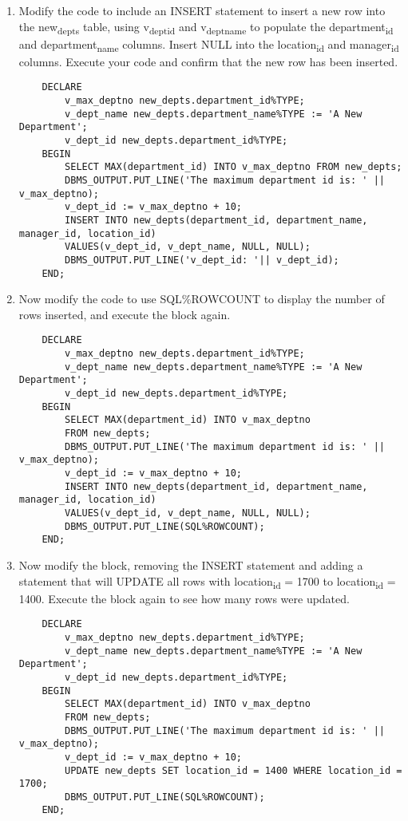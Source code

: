\documentclass[11pt]{article}
\begin{document}
\begin{enumerate}
\item Modify the code to include an INSERT statement to insert a new row into the new\textsubscript{depts} table, using v\textsubscript{dept}\textsubscript{id} and v\textsubscript{dept}\textsubscript{name} to populate the department\textsubscript{id} and department\textsubscript{name} columns. Insert NULL into the location\textsubscript{id} and manager\textsubscript{id} columns.  Execute your code and confirm that the new row has been inserted.

\begin{verbatim}
    DECLARE
        v_max_deptno new_depts.department_id%TYPE;
        v_dept_name new_depts.department_name%TYPE := 'A New Department';
        v_dept_id new_depts.department_id%TYPE;
    BEGIN
        SELECT MAX(department_id) INTO v_max_deptno FROM new_depts;
        DBMS_OUTPUT.PUT_LINE('The maximum department id is: ' || v_max_deptno);
        v_dept_id := v_max_deptno + 10;
        INSERT INTO new_depts(department_id, department_name, manager_id, location_id)
        VALUES(v_dept_id, v_dept_name, NULL, NULL);
        DBMS_OUTPUT.PUT_LINE('v_dept_id: '|| v_dept_id);
    END;
\end{verbatim}

\item Now modify the code to use SQL\%ROWCOUNT to display the number of rows inserted, and execute the block again.

\begin{verbatim}
    DECLARE
        v_max_deptno new_depts.department_id%TYPE;
        v_dept_name new_depts.department_name%TYPE := 'A New Department';
        v_dept_id new_depts.department_id%TYPE;
    BEGIN
        SELECT MAX(department_id) INTO v_max_deptno
        FROM new_depts;
        DBMS_OUTPUT.PUT_LINE('The maximum department id is: ' || v_max_deptno);
        v_dept_id := v_max_deptno + 10;
        INSERT INTO new_depts(department_id, department_name, manager_id, location_id)
        VALUES(v_dept_id, v_dept_name, NULL, NULL);
        DBMS_OUTPUT.PUT_LINE(SQL%ROWCOUNT);
    END;
\end{verbatim}

\item Now modify the block, removing the INSERT statement and adding a statement that will UPDATE all rows with location\textsubscript{id} = 1700 to location\textsubscript{id} = 1400. Execute the block again to see how many rows were updated.
\begin{verbatim}
    DECLARE
        v_max_deptno new_depts.department_id%TYPE;
        v_dept_name new_depts.department_name%TYPE := 'A New Department';
        v_dept_id new_depts.department_id%TYPE;
    BEGIN
        SELECT MAX(department_id) INTO v_max_deptno
        FROM new_depts;
        DBMS_OUTPUT.PUT_LINE('The maximum department id is: ' || v_max_deptno);
        v_dept_id := v_max_deptno + 10;
        UPDATE new_depts SET location_id = 1400 WHERE location_id = 1700;
        DBMS_OUTPUT.PUT_LINE(SQL%ROWCOUNT);
    END;
\end{verbatim}
\end{enumerate}
\end{document}
